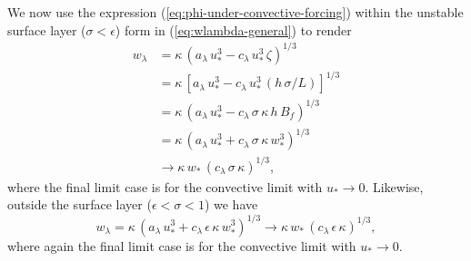 \begin{itemize}
\begin{itemize}
We now use the expression (\ref{eq:phi-under-convective-forcing})
within the unstable surface layer ($\sigma < \epsilon$) form in
(\ref{eq:wlambda-general}) to render
\begin{subequations}
\begin{align}
w_{\lambda} &= \kappa \, (a_{\lambda} \, u_{*}^{3} - c_{\lambda} \, u_{*}^{3} \, \zeta)^{1/3}
 \\
 &= \kappa \, [a_{\lambda} \, u_{*}^{3} - c_{\lambda} \, u_{*}^{3} \, (h\, \sigma/L) ]^{1/3}
 \\
 &= \kappa \, (a_{\lambda} \, u_{*}^{3} - c_{\lambda} \, \sigma \, \kappa \, h \, B_{f} )^{1/3}
\\
&= \kappa \, (a_{\lambda} \, u_{*}^{3} + c_{\lambda} \, \sigma \, \kappa \, w_{*}^{3} )^{1/3}
\\
 &\rightarrow 
  \kappa \, w_{*} \, (c_{\lambda} \, \sigma \, \kappa)^{1/3},
\end{align}
\end{subequations}
where the final limit case is for the convective limit with $u_{*}
\rightarrow 0$.  Likewise, outside the surface layer ($\epsilon <
\sigma < 1$) we have
\begin{equation}
w_{\lambda} = \kappa \, (a_{\lambda} \, u_{*}^{3} + c_{\lambda} \, \epsilon \, \kappa \, w_{*}^{3} )^{1/3}
  \rightarrow 
  \kappa \, w_{*} \, (c_{\lambda} \, \epsilon \, \kappa)^{1/3},
\end{equation}
where again the final limit case is for the convective limit with
$u_{*} \rightarrow 0$.  

\end{itemize}

\end{itemize}




